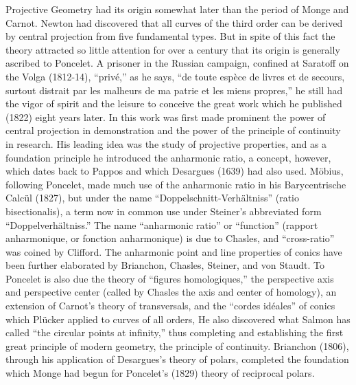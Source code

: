 \documentclass[oneside]{book}
\begin{document}
Projective Geometry had its origin somewhat later than the period of
Monge and Carnot. Newton had discovered that all curves of the third
order can be derived by central projection from five fundamental
types. But in spite of this fact the theory attracted so little
attention for over a century that its origin is generally ascribed
to Poncelet. A prisoner in the Russian campaign, confined at
Saratoff on the Volga (1812-14), ``priv\'e,'' as he says, ``de toute
esp\`ece de livres et de secours, surtout distrait par les
malheurs de ma patrie et les miens propres,'' he still had the vigor
of spirit and the leisure to conceive the great work which he
published (1822) eight years later. In this work was first made
prominent the power of central projection in demonstration and the
power of the principle of continuity in research. His leading idea
was the study of projective properties, and as a foundation
principle he introduced the anharmonic ratio, a concept, however,
which dates back to Pappos and which Desargues (1639) had also
used. M\"obius, following Poncelet, made much use of the anharmonic
ratio in his Barycentrische Calc\"ul (1827), but under the name
``Doppelschnitt-Verh\"altniss'' (ratio bisectionalis), a term now in
common use under Steiner's abbreviated form ``Doppelverh\"altniss.''
The name ``anharmonic ratio'' or ``function'' (rapport anharmonique,
or fonction anharmonique) is due to Chasles, and ``cross-ratio'' was
coined by Clifford. The anharmonic point and line properties of
conics have been further elaborated by Brianchon, Chasles, Steiner,
and von Staudt. To Poncelet is also due the theory of ``figures
homologiques,'' the perspective axis and perspective center (called
by Chasles the axis and center of homology), an extension of
Carnot's theory of transversals, and the ``cordes id\'eales'' of
conics which Pl\"ucker applied to curves of all orders, He also
discovered what Salmon has called ``the circular points at
infinity,'' thus completing and establishing the first great
principle of modern geometry, the principle of continuity. Brianchon
(1806), through his application of Desargues's theory of polars,
completed the foundation which Monge had begun for Poncelet's (1829)
theory of reciprocal polars.
\end{document}
